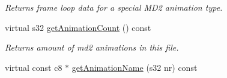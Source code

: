 \begin{DoxyCompactItemize}
\begin{DoxyCompactList}\small\item\em Returns frame loop data for a special M\-D2 animation type. \end{DoxyCompactList}\item 
\hypertarget{classirr_1_1scene_1_1_c_animated_mesh_m_d2_a1040cae5da1a40c7daf06e84facba9de}{virtual s32 \hyperlink{classirr_1_1scene_1_1_c_animated_mesh_m_d2_a1040cae5da1a40c7daf06e84facba9de}{get\-Animation\-Count} () const }\label{classirr_1_1scene_1_1_c_animated_mesh_m_d2_a1040cae5da1a40c7daf06e84facba9de}

\begin{DoxyCompactList}\small\item\em Returns amount of md2 animations in this file. \end{DoxyCompactList}\item 
virtual const c8 $\ast$ \hyperlink{classirr_1_1scene_1_1_c_animated_mesh_m_d2_ac4a3c44c157256b7caf0cf90c4f40362}{get\-Animation\-Name} (s32 nr) const 
\end{DoxyCompactItemize}
